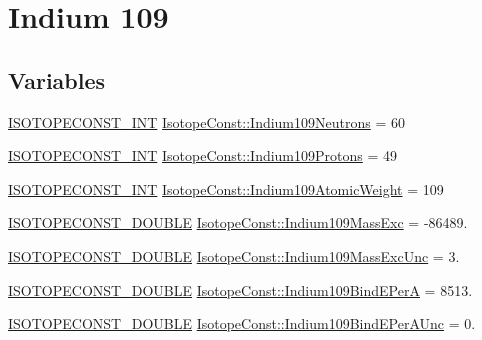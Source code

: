 \hypertarget{group___isotope_const-_indium-_in109}{}\section{Indium 109}
\label{group___isotope_const-_indium-_in109}
\subsection*{Variables}
\begin{DoxyCompactItemize}
\item 
\mbox{\hyperlink{group___isotope_const-_macros_ga5f18360b3e99483a35c32d789e62621c}{I\+S\+O\+T\+O\+P\+E\+C\+O\+N\+S\+T\+\_\+\+I\+NT}} \mbox{\hyperlink{group___isotope_const-_indium-_in109_ga8c347308f5d0601cc16dc72c658784fb}{Isotope\+Const\+::\+Indium109\+Neutrons}} = 60
\item 
\mbox{\hyperlink{group___isotope_const-_macros_ga5f18360b3e99483a35c32d789e62621c}{I\+S\+O\+T\+O\+P\+E\+C\+O\+N\+S\+T\+\_\+\+I\+NT}} \mbox{\hyperlink{group___isotope_const-_indium-_in109_ga9a7719759ce071be3f5c0f155c211092}{Isotope\+Const\+::\+Indium109\+Protons}} = 49
\item 
\mbox{\hyperlink{group___isotope_const-_macros_ga5f18360b3e99483a35c32d789e62621c}{I\+S\+O\+T\+O\+P\+E\+C\+O\+N\+S\+T\+\_\+\+I\+NT}} \mbox{\hyperlink{group___isotope_const-_indium-_in109_gac17475963a915d48261ad1a09ad63a68}{Isotope\+Const\+::\+Indium109\+Atomic\+Weight}} = 109
\item 
\mbox{\hyperlink{group___isotope_const-_macros_ga8f45a7272ce02c0b4c65c44636ed719a}{I\+S\+O\+T\+O\+P\+E\+C\+O\+N\+S\+T\+\_\+\+D\+O\+U\+B\+LE}} \mbox{\hyperlink{group___isotope_const-_indium-_in109_gaa68036ab661243d4feb0e171f0ed88ad}{Isotope\+Const\+::\+Indium109\+Mass\+Exc}} = -\/86489.
\item 
\mbox{\hyperlink{group___isotope_const-_macros_ga8f45a7272ce02c0b4c65c44636ed719a}{I\+S\+O\+T\+O\+P\+E\+C\+O\+N\+S\+T\+\_\+\+D\+O\+U\+B\+LE}} \mbox{\hyperlink{group___isotope_const-_indium-_in109_ga5fc474d838702fcb4770a546ab21819f}{Isotope\+Const\+::\+Indium109\+Mass\+Exc\+Unc}} = 3.
\item 
\mbox{\hyperlink{group___isotope_const-_macros_ga8f45a7272ce02c0b4c65c44636ed719a}{I\+S\+O\+T\+O\+P\+E\+C\+O\+N\+S\+T\+\_\+\+D\+O\+U\+B\+LE}} \mbox{\hyperlink{group___isotope_const-_indium-_in109_gad12738632cb018f5b989277e6ad6e64c}{Isotope\+Const\+::\+Indium109\+Bind\+E\+PerA}} = 8513.
\item 
\mbox{\hyperlink{group___isotope_const-_macros_ga8f45a7272ce02c0b4c65c44636ed719a}{I\+S\+O\+T\+O\+P\+E\+C\+O\+N\+S\+T\+\_\+\+D\+O\+U\+B\+LE}} \mbox{\hyperlink{group___isotope_const-_indium-_in109_ga74aea466e2de4ec92126e1c2b5056499}{Isotope\+Const\+::\+Indium109\+Bind\+E\+Per\+A\+Unc}} = 0.

\end{DoxyCompactItemize}
